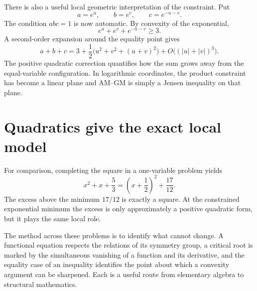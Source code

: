 There is also a useful local geometric interpretation of the constraint. Put
\[
 a=e^u,\qquad b=e^v,\qquad c=e^{-u-v}.
\]
The condition \(abc=1\) is now automatic. By convexity of the exponential,
\[
 e^u+e^v+e^{-u-v}\ge3.
\]
A second-order expansion around the equality point gives
\[
 a+b+c
 =3+\frac12\bigl(u^2+v^2+(u+v)^2\bigr)
  +O\bigl((|u|+|v|)^3\bigr).
\]
The positive quadratic correction quantifies how the sum grows away from the equal-variable configuration. In logarithmic coordinates, the product constraint has become a linear plane and AM--GM is simply a Jensen inequality on that plane.

\section{Quadratics give the exact local model}

For comparison, completing the square in a one-variable problem yields
\[
 x^2+x+\frac53
 =\left(x+\frac12\right)^2+\frac{17}{12}.
\]
The excess above the minimum \(17/12\) is exactly a square. At the constrained exponential minimum the excess is only approximately a positive quadratic form, but it plays the same local role.

The method across these problems is to identify what cannot change. A functional equation respects the relations of its symmetry group, a critical root is marked by the simultaneous vanishing of a function and its derivative, and the equality case of an inequality identifies the point about which a convexity argument can be sharpened. Each is a useful route from elementary algebra to structural mathematics.
